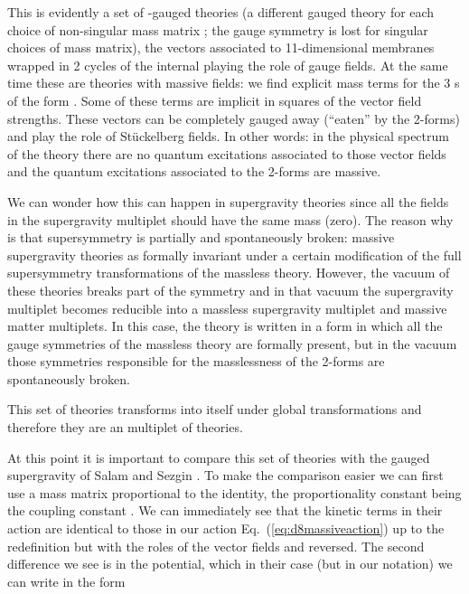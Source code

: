 \documentclass[12pt,a4paper]{article}
\begin{document}
This is evidently a set of \coordHE{}-gauged theories (a different gauged
theory for each choice of non-singular mass matrix \coordHE{}; the
\coordHE{} gauge symmetry is lost for singular choices of mass matrix),
the vectors \coordHE{} associated to 11-dimensional membranes wrapped
in 2 cycles of the internal \coordHE{} playing the role of \coordHE{} gauge
fields.  At the same time these are theories with massive fields: we
find explicit mass terms for the 3 \coordHE{}s of the form
\coordHE{}.  Some of these terms are implicit in squares of
the \coordHE{} vector field strengths. These vectors can be completely
gauged away (``eaten'' by the 2-forms) and play the role of
St\"uckelberg fields. In other words: in the physical spectrum of the
theory there are no quantum excitations associated to those vector
fields and the quantum excitations associated to the 2-forms are
massive.

We can wonder how this can happen in supergravity theories since all
the fields in the supergravity multiplet should have the same mass
(zero). The reason why is that supersymmetry is partially and
spontaneously broken: massive supergravity theories as formally
invariant under a certain modification of the full supersymmetry
transformations of the massless theory. However, the vacuum of these
theories breaks part of the symmetry and in that vacuum the
supergravity multiplet becomes reducible into a massless supergravity
multiplet and massive matter multiplets. In this case, the theory is
written in a form in which all the gauge symmetries of the massless
theory are formally present, but in the vacuum those symmetries
responsible for the masslessness of the 2-forms are spontaneously
broken.

This set of theories transforms into itself under global
\coordHE{} transformations and therefore they are an
\coordHE{} multiplet of theories.

At this point it is important to compare this set of theories with the
\coordHE{}  \coordHE{} gauged supergravity of Salam and Sezgin \cite{kn:SaSe}.
To make the comparison easier we can first use a mass matrix
proportional to the identity, the proportionality constant being the
coupling constant \coordHE{}. We can immediately see that the kinetic terms
in their action are identical to those in our action
Eq.~(\ref{eq:d8massiveaction}) up to the redefinition \coordHE{} but with the roles of the vector fields
\coordHE{} and \coordHE{} reversed. The second difference we see is in
the potential, which in their case (but in our notation) we can write
in the form
\end{document}
